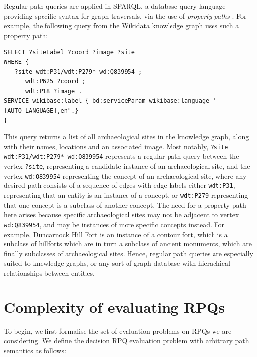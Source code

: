 \documentclass{article}
\begin{document}
Regular path queries are applied in SPARQL, a database query language providing specific syntax for graph traversals, via the use of \emph{property paths} \cite{SPARQLQueryLanguage}. For example, the following query from the Wikidata knowledge graph \cite{WikidataSPARQLQuery} uses such a property path:

\begin{lstlisting}
SELECT ?siteLabel ?coord ?image ?site
WHERE {
   ?site wdt:P31/wdt:P279* wd:Q839954 ;
      wdt:P625 ?coord ;
      wdt:P18 ?image .
SERVICE wikibase:label { bd:serviceParam wikibase:language "[AUTO_LANGUAGE],en".}
}
\end{lstlisting}

This query returns a list of all archaeological sites in the knowledge graph, along with their names, locations and an associated image. Most notably, \texttt{?site wdt:P31/wdt:P279* wd:Q839954} represents a regular path query between the vertex \texttt{?site}, representing a candidate instance of an archaeological site, and the vertex \texttt{wd:Q839954} representing the concept of an archaeological site, where any desired path consists of a sequence of edges with edge labels either \texttt{wdt:P31}, representing that an entity is an instance of a concept, or \texttt{wdt:P279} representing that one concept is a subclass of another concept. The need for a property path here arises because specific archaeological sites may not be adjacent to vertex \texttt{wd:Q839954}, and may be instances of more specific concepts instead. For example, Duncarnock Hill Fort is an instance of a contour fort, which is a subclass of hillforts which are in turn a subclass of ancient monuments, which are finally subclasses of archaeological sites. Hence, regular path queries are especially suited to knowledge graphs, or any sort of graph database with hierachical relationships between entities.

\section{Complexity of evaluating RPQs}
\label{sec:complexity}

To begin, we first formalise the set of evaluation problems on RPQs we are considering. We define the decision RPQ evaluation problem with arbitrary path semantics as follows:

 \\
\end{document}
